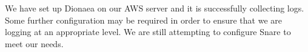 We have set up Dionaea on our AWS server and it is successfully collecting logs. Some further configuration may be required in order to ensure that we are logging at an appropriate level. We are still attempting to configure Snare to meet our needs. 